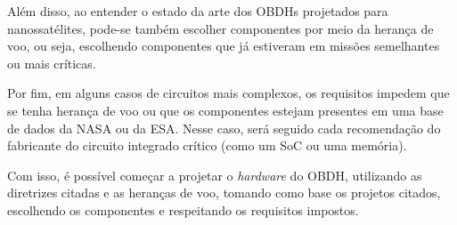 Além disso, ao entender o estado da arte dos OBDHs projetados para nanossatélites, pode-se também escolher componentes por meio da herança de voo, ou seja, escolhendo componentes que já estiveram em missões semelhantes ou mais críticas.

Por fim, em alguns casos de circuitos mais complexos, os requisitos impedem que se tenha herança de voo ou que os componentes estejam presentes em uma base de dados da NASA ou da ESA. Nesse caso, será seguido cada recomendação do fabricante do circuito integrado crítico (como um SoC ou uma memória). 

Com isso, é possível começar a projetar o \textit{hardware} do OBDH, utilizando as diretrizes citadas e as heranças de voo, tomando como base os projetos citados, escolhendo os componentes e respeitando os requisitos impostos.



 

